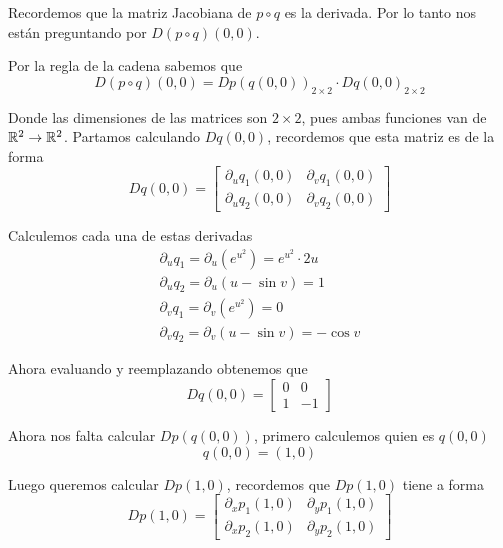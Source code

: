 \documentclass[a4paper,oneside,10.5pt]{article}
\begin{document}
\begin{sol}
Recordemos que la matriz Jacobiana de $p \circ q$ es la derivada. Por lo tanto nos están preguntando por $D(p \circ q)(0, 0)$.

Por la regla de la cadena sabemos que
\begin{equation*}
    D(p \circ q)(0, 0) = Dp(q(0, 0))_{2 \times 2} \cdot Dq(0, 0)_{2 \times 2}
\end{equation*}

Donde las dimensiones de las matrices son $2 \times 2$, pues ambas funciones van de $\mathbb{R}^2 \to \mathbb{R}^2$. Partamos calculando $Dq(0 ,0)$, recordemos que esta matriz es de la forma
\begin{equation*}
    Dq(0, 0) = \begin{bmatrix}
        \partial_u q_1(0, 0) & \partial_v q_1(0, 0)\\
        \partial_u q_2(0, 0) & \partial_v q_2(0, 0)
    \end{bmatrix}
\end{equation*}

Calculemos cada una de estas derivadas
\begin{gather*}
    \partial_u q_1 = \partial_u (e^{u^2}) = e^{u^2} \cdot 2 u\\
    \partial_u q_2 = \partial_u (u - \sin v) = 1\\
    \partial_v q_1 = \partial_v (e^{u^2}) = 0\\
    \partial_v q_2 = \partial_v (u - \sin v) = - \cos v
\end{gather*}

Ahora evaluando y reemplazando obtenemos que
\begin{equation*}
    Dq(0, 0) = \begin{bmatrix}
        0 & 0\\
        1 & -1
    \end{bmatrix}
\end{equation*}

Ahora nos falta calcular $Dp(q(0, 0))$, primero calculemos quien es $q(0, 0)$
\begin{equation*}
    q(0, 0) = (1, 0)
\end{equation*}

Luego queremos calcular $Dp(1, 0)$, recordemos que $Dp(1, 0)$ tiene a forma
\begin{equation*}
    Dp(1, 0) = \begin{bmatrix}
        \partial_x p_1(1, 0) & \partial_y p_1(1, 0)\\
        \partial_x p_2(1, 0) & \partial_y p_2(1, 0)
    \end{bmatrix}
\end{equation*}


\end{sol}
\end{document}
